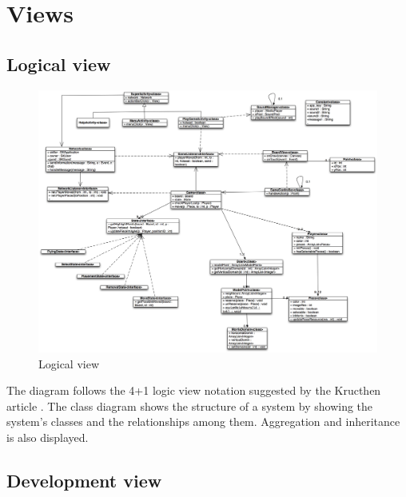 \pagebreak

\section{Views}
\subsection{Logical view}
\label{section:logical_view}

\begin{figure}[H]
\begin{center}
\includegraphics[width=1.2\textwidth]{./Images/LogicalView_final.png}
\end{center}
\caption{Logical view}
\end{figure}

The diagram follows the 4+1 logic view notation suggested by the Kructhen article \cite{krutchen}. The class diagram shows the structure of a system by showing the system's classes  and the relationships among them. Aggregation and inheritance is also displayed.

\subsection{Development view}

